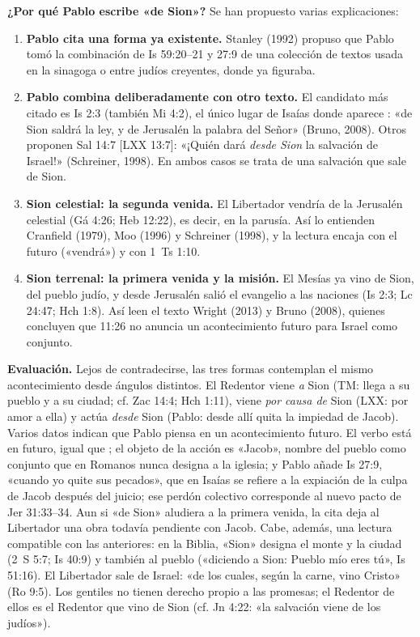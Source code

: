 \textbf{¿Por qué Pablo escribe «de Sion»?} Se han propuesto varias explicaciones:
\begin{enumerate}
\item \textbf{Pablo cita una forma ya existente.} Stanley (1992) propuso que Pablo tomó la combinación de Is 59:20--21 y 27:9 de una colección de textos usada en la sinagoga o entre judíos creyentes, donde  ya figuraba.
\item \textbf{Pablo combina deliberadamente con otro texto.} El candidato más citado es Is 2:3 (también Mi 4:2), el único lugar de Isaías donde aparece : «de Sion saldrá la ley, y de Jerusalén la palabra del Señor» (Bruno, 2008). Otros proponen Sal 14:7 [LXX 13:7]: «¡Quién dará \emph{desde Sion} la salvación de Israel!» (Schreiner, 1998). En ambos casos se trata de una salvación que sale de Sion.
\item \textbf{Sion celestial: la segunda venida.} El Libertador vendría de la Jerusalén celestial (Gá 4:26; Heb 12:22), es decir, en la parusía. Así lo entienden Cranfield (1979), Moo (1996) y Schreiner (1998), y la lectura encaja con el futuro  («vendrá») y con 1~Ts 1:10.
\item \textbf{Sion terrenal: la primera venida y la misión.} El Mesías ya vino de Sion, del pueblo judío, y desde Jerusalén salió el evangelio a las naciones (Is 2:3; Lc 24:47; Hch 1:8). Así leen el texto Wright (2013) y Bruno (2008), quienes concluyen que 11:26 no anuncia un acontecimiento futuro para Israel como conjunto.
\end{enumerate}

\textbf{Evaluación.} Lejos de contradecirse, las tres formas contemplan el mismo acontecimiento desde ángulos distintos. El Redentor viene \emph{a} Sion (TM: llega a su pueblo y a su ciudad; cf. Zac 14:4; Hch 1:11), viene \emph{por causa de} Sion (LXX: por amor a ella) y actúa \emph{desde} Sion (Pablo: desde allí quita la impiedad de Jacob). Varios datos indican que Pablo piensa en un acontecimiento futuro. El verbo  está en futuro, igual que ; el objeto de la acción es «Jacob», nombre del pueblo como conjunto que en Romanos nunca designa a la iglesia; y Pablo añade Is 27:9, «cuando yo quite sus pecados», que en Isaías se refiere a la expiación de la culpa de Jacob después del juicio; ese perdón colectivo corresponde al nuevo pacto de Jer 31:33--34. Aun si «de Sion» aludiera a la primera venida, la cita deja al Libertador una obra todavía pendiente con Jacob. Cabe, además, una lectura compatible con las anteriores: en la Biblia, «Sion» designa el monte y la ciudad (2~S 5:7; Is 40:9) y también al pueblo («diciendo a Sion: Pueblo mío eres tú», Is 51:16). El Libertador sale de Israel: «de los cuales, según la carne, vino Cristo» (Ro 9:5). Los gentiles no tienen derecho propio a las promesas; el Redentor de ellos es el Redentor que vino de Sion (cf. Jn 4:22: «la salvación viene de los judíos»).

